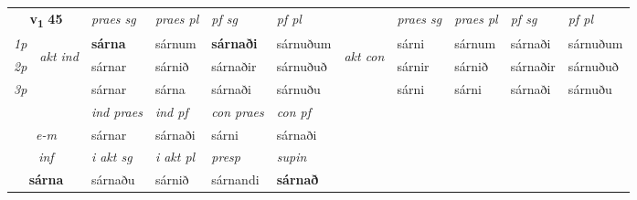 \noindent
\begin{tabular}{lllllllllll} \toprule
\multicolumn{2}{c}{\textbf{v{\textsubscript{1}}} \Large{\textbf{45}}}  &  \textit{praes sg}  & \textit{praes pl}  &\textit{ pf sg} & \textit{pf pl} &  &  \textit{praes sg}  & \textit{praes pl}  & \textit{pf sg} & \textit{pf pl } \\*
	\cmidrule{3-6} \cmidrule{8-11}
 {\textit{1p}} & \multirow{3}{*}{\begin{turn}{90}\textit{akt ind}\end{turn}} & \textbf{sárna} & sárnum & \textbf{sárnaði} & sárnuðum & \multirow{3}{*}{\begin{turn}{90}\textit{akt con}\end{turn}} &sárni & sárnum & sárnaði & sárnuðum\\*
 {\textit{2p}} &  &  sárnar  & sárnið & sárnaðir & sárnuðuð & & sárnir & sárnið & sárnaðir & sárnuðuð \\*
{\textit{3p}} &  & sárnar & sárna & sárnaði & sárnuðu & & sárni & sárni& sárnaði & sárnuðu \\*
\cmidrule{3-6} \cmidrule{8-11}

   & &  \textit{ind praes} & \textit{ind pf} & \textit{con praes} & \textit{con pf} \\*
\multicolumn{2}{c}{ \textit{e-m} } & sárnar & sárnaði & sárni & sárnaði \\*

\cmidrule{3-6}
   \multicolumn{2}{c}{\textit{inf}}  & \textit{i akt sg} & \textit{i akt pl}   & \textit{presp} & \textit{supin}   \\*
  \multicolumn{2}{c}{\textbf{sárna}} & sárnaðu  & sárnið   & sárnandi &  \textbf{sárnað}   \\*
\end{tabular}

